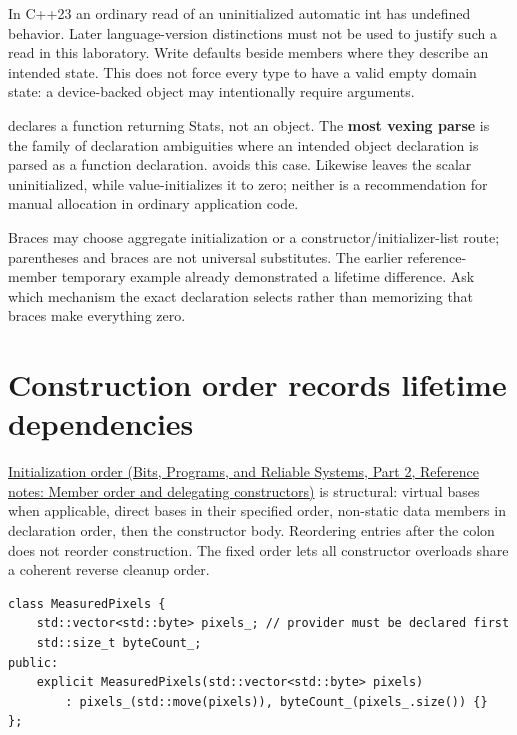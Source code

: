 In C++23 an ordinary read of an uninitialized automatic int has undefined behavior. Later language-version distinctions must not be used to justify such a read in this laboratory. Write defaults beside members where they describe an intended state. This does not force every type to have a valid empty domain state: a device-backed object may intentionally require arguments.

 declares a function returning Stats, not an object. The \textbf{most vexing parse} is the family of declaration ambiguities where an intended object declaration is parsed as a function declaration.  avoids this case. Likewise  leaves the scalar uninitialized, while  value-initializes it to zero; neither is a recommendation for manual allocation in ordinary application code.

Braces may choose aggregate initialization or a constructor/initializer-list route; parentheses and braces are not universal substitutes. The earlier reference-member temporary example already demonstrated a lifetime difference. Ask which mechanism the exact declaration selects rather than memorizing that braces make everything zero.

\section{Construction order records lifetime dependencies}\label{05-engine-i-ch003-construction-order-records-lifetime-dependencies}

\hypertarget{05-engine-i-ch003-construction-order-records-lifetime-dependencies}{}

\href{../01-Bits-Programs-and-Reliable-Systems-P02/main.pdf\#nameddest=appendix-3cb49709605a}{Initialization order (Bits, Programs, and Reliable Systems, Part 2, Reference notes: Member order and delegating constructors)} is structural: virtual bases when applicable, direct bases in their specified order, non-static data members in declaration order, then the constructor body. Reordering entries after the colon does not reorder construction. The fixed order lets all constructor overloads share a coherent reverse cleanup order.

\begin{verbatim}
class MeasuredPixels {
    std::vector<std::byte> pixels_; // provider must be declared first
    std::size_t byteCount_;
public:
    explicit MeasuredPixels(std::vector<std::byte> pixels)
        : pixels_(std::move(pixels)), byteCount_(pixels_.size()) {}
};
\end{verbatim}

